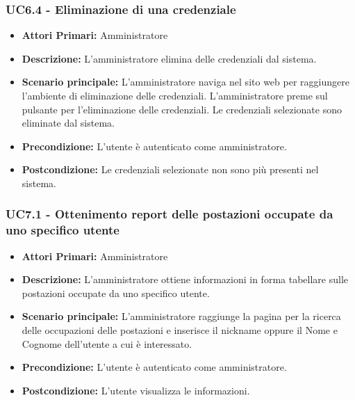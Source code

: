 \subsubsection{ UC6.4 - Eliminazione di una credenziale}
\begin{itemize}
	\item\textbf{Attori Primari:} 
	Amministratore
	\item\textbf{Descrizione:} 
	L'amministratore elimina delle credenziali dal sistema.
	\item\textbf{Scenario principale:} 
	L'amministratore naviga nel sito web per raggiungere l'ambiente di eliminazione delle credenziali.
	L'amministratore preme sul pulsante per l'eliminazione delle credenziali.
	Le credenziali selezionate sono eliminate dal sistema.
	\item\textbf{Precondizione:} 
	L'utente è autenticato come amministratore.
	\item\textbf{Postcondizione:}
	Le credenziali selezionate non sono più presenti nel sistema.
\end{itemize}


\subsubsection{ UC7.1 - Ottenimento report delle postazioni occupate da uno specifico utente}
\begin{itemize}
           	\item\textbf{Attori Primari:} 
           	Amministratore
           	\item\textbf{Descrizione:} 
           	L'amministratore ottiene informazioni in forma tabellare sulle postazioni occupate da uno specifico utente.
           	\item\textbf{Scenario principale:} 
           	L'amministratore raggiunge la pagina per la ricerca delle occupazioni delle postazioni e inserisce il nickname oppure il Nome e Cognome dell'utente a cui è interessato.
           	\item\textbf{Precondizione:} 
           	L'utente è autenticato come amministratore.
           	\item\textbf{Postcondizione:}
           	L'utente visualizza le informazioni.
\end{itemize}


